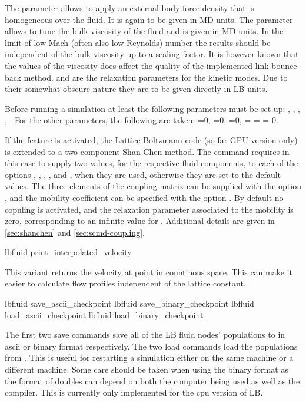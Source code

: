 The parameter  allows to apply an external body force
density that is homogeneous over the fluid. It is again to be given in
MD units.  The parameter  allows to tune the bulk
viscosity of the fluid and is given in MD units. In the limit of low
Mach (often also low Reynolds) number the results should be
independent of the bulk viscosity up to a scaling factor. 
It is however known that the values of the viscosity does 
affect the quality of the implemented link-bounce-back method.
 and
 are the relaxation parameters for the kinetic
modes. Due to their somewhat obscure nature they are to be given
directly in LB units.

Before running a simulation at least the following parameters must be
set up: , , , ,
. For the other parameters, the following are taken:
=0, =0, =0,
 =  =  = 0.

If the feature  is activated, the Lattice Boltzmann
code (so far GPU version only) is extended to a two-component
Shan-Chen method.  The  command requires in this case
to supply two values, for the respective fluid components, to each
of the options , , , ,
 and , when they are used, otherwise
they are set to the default values. The three elements of the
coupling matrix can be supplied with the option ,
and the mobility coefficient can be
specified with the option . By default no copuling is activated, and the relaxation parameter associated to the mobility is zero, corresponding to an infinite value for . Additional details are
given in \ref{sec:shanchen} and \ref{sec:scmd-coupling}.

\begin{essyntax}
  lbfluid print_interpolated_velocity   
\end{essyntax}
This variant returns the velocity at point in countinous space. 
This can make it easier to calculate flow profiles independent of
the lattice constant.

\begin{essyntax}
  lbfluid save_ascii_checkpoint 
  lbfluid save_binary_checkpoint 
  lbfluid load_ascii_checkpoint 
  lbfluid load_binary_checkpoint 
\end{essyntax}
The first two save commands save all of the LB fluid nodes' populations to  in ascii or binary format respectively.
The two load commands load the populations from .  This is  useful for restarting a simulation either on the same
machine or a different machine.  Some care should be taken when using the binary format as the format of doubles can depend
on both the computer being used as well as the compiler.  This is currently  only implemented for the cpu version of LB.

